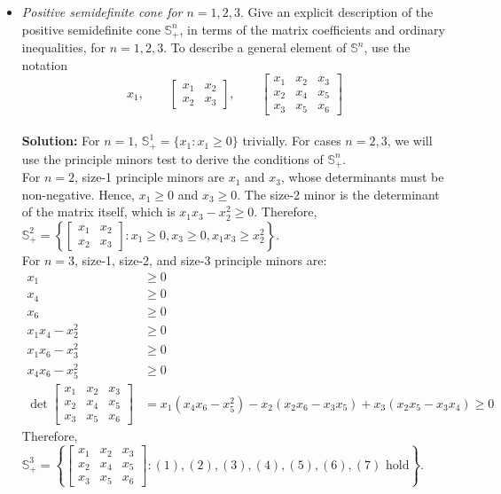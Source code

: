 \documentclass{article}
\begin{document}
\begin{itemize}
  \item[2.28] \textit{Positive semidefinite cone for $n = 1, 2, 3$}. Give an explicit description of the positive semidefinite cone $\mathbb{S}_+^n$, in terms of the matrix coefficients and ordinary inequalities, for $n = 1, 2, 3$. To describe a general element of $\mathbb{S}^n$, use the notation
  \[
    x_1, \qquad
    \begin{bmatrix} x_1 & x_2 \\ x_2 & x_3 \end{bmatrix}, \qquad
    \begin{bmatrix} x_1 & x_2 & x_3 \\ x_2 & x_4 & x_5 \\ x_3 & x_5 & x_6 \end{bmatrix}
  \] \\

  \textbf{Solution:} For $n = 1$, $\mathbb{S}_+^1 = \{x_1 : x_1 \ge 0\}$ trivially. For cases $n = 2, 3$, we will use the principle minors test to derive the conditions of $\mathbb{S}_+^n$. \\
  For $n = 2$, size-1 principle minors are $x_1$ and $x_3$, whose determinants must be non-negative. Hence, $x_1 \ge 0$ and $x_3 \ge 0$. The size-2 minor is the determinant of the matrix itself, which is $x_1 x_3 - x_2^2 \ge 0$. Therefore, $\mathbb{S}_+^2 = \left\{\begin{bmatrix} x_1 & x_2 \\ x_2 & x_3 \end{bmatrix} : x_1 \ge 0, x_3 \ge 0, x_1 x_3 \ge x_2^2\right\}$. \\
  For $n = 3$, size-1, size-2, and size-3 principle minors are:
  \begin{align*}
    x_1 &\ge 0 \tag{1} \\
    x_4 &\ge 0 \tag{2} \\
    x_6 &\ge 0 \tag{3} \\
    x_1 x_4 - x_2^2 &\ge 0 \tag{4} \\
    x_1 x_6 - x_3^2 &\ge 0 \tag{5} \\
    x_4 x_6 - x_5^2 &\ge 0 \tag{6} \\
    \det\begin{bmatrix} x_1 & x_2 & x_3 \\ x_2 & x_4 & x_5 \\ x_3 & x_5 & x_6 \end{bmatrix} &= x_1 (x_4 x_6 - x_5^2) - x_2 (x_2 x_6 - x_3 x_5) + x_3 (x_2 x_5 - x_3 x_4) \ge 0 \tag{7}
  \end{align*}
  Therefore, $\mathbb{S}_+^3 = \left\{\begin{bmatrix} x_1 & x_2 & x_3 \\ x_2 & x_4 & x_5 \\ x_3 & x_5 & x_6 \end{bmatrix} : (1), (2), (3), (4), (5), (6), (7) \text{ hold}\right\}$.


\end{itemize}
\end{document}

